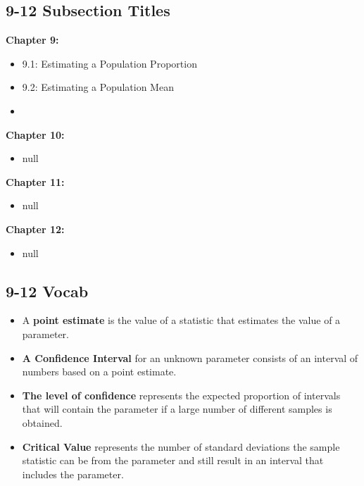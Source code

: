 \documentclass{report}
\begin{document}
        \pagebreak 
        \subsection*{9-12 Subsection Titles}
        \bigbreak \noindent 
        \textbf{Chapter 9:}
        \begin{itemize}
          \item 9.1: Estimating a Population Proportion
          \item 9.2: Estimating a Population Mean
          \item 
        \end{itemize}
        \bigbreak \noindent 
        \textbf{Chapter 10:}
        \begin{itemize}
          \item null 
        \end{itemize}
        \bigbreak \noindent 
        \textbf{Chapter 11:}
        \begin{itemize}
          \item null 
        \end{itemize}
        \bigbreak \noindent 
        \textbf{Chapter 12:}
        \begin{itemize}
          \item null 
        \end{itemize}

        \pagebreak 
        \subsection*{9-12 Vocab}
        \begin{itemize}
          \item A \textbf{point estimate} is the value of a statistic that estimates the value of a parameter.
          \item \textbf{A Confidence Interval} for an  unknown parameter consists of an interval of numbers based on a point estimate.
          \item \textbf{The level of confidence} represents the expected proportion of intervals that will contain the parameter if a large number of different samples is obtained.
          \item \textbf{Critical Value} represents the number of standard deviations the sample statistic can be from the parameter and still result in an interval that includes the parameter.
        \end{itemize}
        \bigbreak \noindent 
\end{document}
